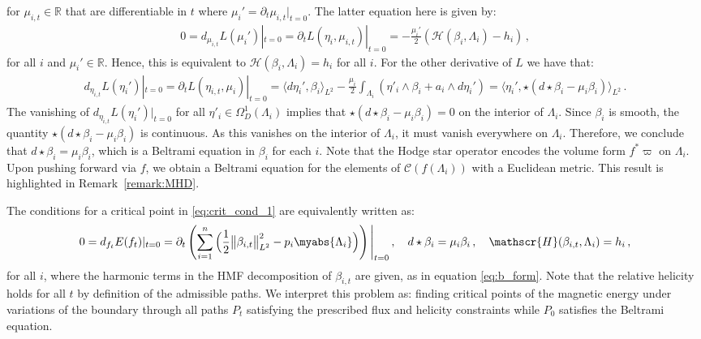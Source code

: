 \documentclass[11pt]{article}
\theoremstyle{plain}
\theoremstyle{definition}
\theoremstyle{remark}
\newcommand{\R}{\mathbb{R}}
\newcommand{\ST}{\Lambda}
\begin{document}
for \(\mu_{i,t} \in \R\) that are differentiable in \(t\) where \(\mu_i' = \partial_t \mu_{i,t}|_{t=0}\). The latter equation here is given by:
\begin{align*}
     0= d_{\mu_{i,t}} L(\mu_i') |_{t=0} = \partial_t L(\eta_{i}, \mu_{i,t}) |_{t=0}  =   - \frac{\mu_i'}{2} \left(   \mathscr{H}( \beta_i,  \ST_i) -  h_i      \right)  \, ,
\end{align*}
for all \(i\) and \(\mu_i' \in \R\). Hence, this is equivalent to \(\mathscr{H}( \beta_i,  \ST_i) =  h_i\) for all \(i\). For the other derivative of \(L\) we have that:
\begin{align*}
d_{\eta_{i,t}} L(\eta_i') |_{t=0} = \partial_t L(\eta_{i,t}, \mu_{i}) |_{t=0}   = \langle d\eta_i',  \beta_i\rangle_{L^2} -  \frac{\mu_i}{2} \int_{\ST_i} (\eta'_i \wedge \beta_i + a_i \wedge d\eta_i')    = \langle \eta_i' , \star (d \star \beta_i - \mu_i \beta_i) \rangle_{L^2} \, .
\end{align*}
The vanishing of \(d_{\eta_{i,t}} L(\eta_i') |_{t=0}\) for all \(\eta'_i \in  \Omega^1_D(\ST_i)\) implies that \(\star (d \star \beta_i - \mu_i \beta_i) = 0\) on the interior of \(\ST_i\). Since \(\beta_i\) is smooth, the quantity \(\star (d \star\beta_i - \mu_i\beta_i)\) is continuous. As this vanishes on the interior of \(\ST_i\), it must vanish everywhere on \(\ST_i\). Therefore, we conclude that \(d \star\beta_i = \mu_i\beta_i\), which is a Beltrami equation in \(\beta_i\) for each \(i\). Note that the Hodge star operator encodes the volume form \(f^* \varpi\) on \(\ST_i\). Upon pushing forward via \(f\), we obtain a Beltrami equation for the elements of \(\mathcal{C}(f(\ST_i))\) with a Euclidean metric. This result is highlighted in Remark~\ref{remark:MHD}.






The conditions for a critical point in \eqref{eq:crit_cond_1} are equivalently written as:
\begin{align} \label{eq:crit_cond_2}
    0 = d_{f_t} E(f_t) |_{t=0} = \partial_t \left(   \sum_{i=1}^n \Big( \frac{1}{2} \big\| \beta_{i,t}\big\|_{L^2}^2 -  p_i \myabs{ \ST_i } \Big)      \right) \Bigg|_{t=0} \, , \quad 
    d \star \beta_{i} = \mu_{i} \beta_{i} \, , \quad \mathscr{H}( \beta_{i,t},  \ST_i) =  h_i \, , 
\end{align}
for all \(i\), where the harmonic terms in the HMF decomposition of \(\beta_{i,t}\) are given, as in equation \eqref{eq:b_form}. Note that the relative helicity holds for all \(t\) by definition of the admissible paths. We interpret this problem as: finding critical points of the magnetic energy under variations of the boundary through all paths \(P_t\) satisfying the prescribed flux and helicity constraints while \(P_0\) satisfies the Beltrami equation. 
\end{document}
